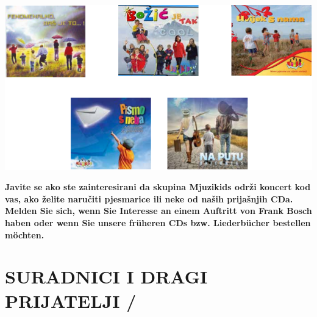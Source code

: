 \documentclass[a4paper,twoside, svgnames]{article}
\begin{document}
\begin{center}
\vspace{1cm}
\includegraphics[width=\linewidth]{images/cd}

\vspace{1cm}
\textbf{Javite se ako ste zainteresirani da skupina Mjuzikids održi koncert kod vas,
ako želite naručiti pjesmarice ili neke od naših prijašnjih CDa.}\\
\vspace{1cm}
\textbf{Melden Sie sich, wenn Sie Interesse an einem Auftritt von Frank Bosch haben oder
wenn Sie unsere früheren CDs bzw. Liederbücher bestellen möchten.}
\vfill

\end{center}

\newpage

\section*{SURADNICI I DRAGI PRIJATELJI /}
\end{document}
